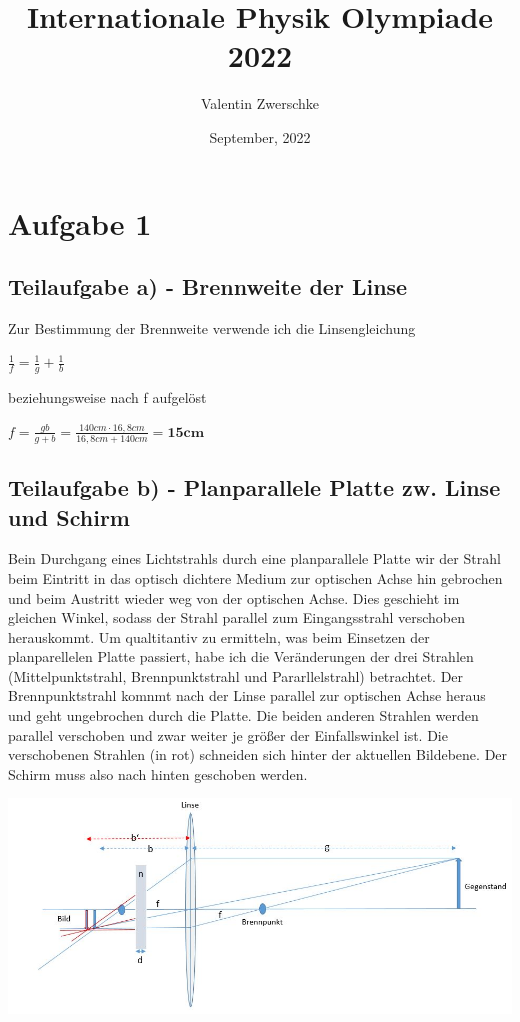 \documentclass{article}
\title{Internationale Physik Olympiade 2022}
\author{Valentin Zwerschke}
\date{September, 2022}
\begin{document}
\maketitle
\section*{Aufgabe 1}
\subsection*{Teilaufgabe a) - Brennweite der Linse}
Zur Bestimmung der Brennweite verwende ich die Linsengleichung
\begin{center}
	$\frac{1}{f}=\frac{1}{g}+\frac{1}{b}$
\end{center}
beziehungsweise nach f aufgelöst
\begin{center}
	$f=\frac{gb}{g+b}=\frac{140cm\cdot16,8cm}{16,8cm+140cm}=\textbf{15cm}$
\end{center}
\subsection*{Teilaufgabe b) - Planparallele Platte zw. Linse und Schirm}
Bein Durchgang eines Lichtstrahls durch eine planparallele Platte wir der Strahl beim Eintritt in das optisch dichtere
Medium zur optischen Achse hin gebrochen und beim Austritt wieder weg von der optischen Achse. Dies geschieht im gleichen Winkel, 
sodass der Strahl parallel zum Eingangsstrahl verschoben herauskommt.   
Um qualtitantiv zu ermitteln, was beim Einsetzen der planparellelen Platte passiert, habe ich die Veränderungen der drei Strahlen (Mittelpunktstrahl, Brennpunktstrahl und Pararllelstrahl) betrachtet.
Der Brennpunktstrahl komnmt nach der Linse parallel zur optischen Achse heraus und geht ungebrochen durch die Platte. Die beiden anderen Strahlen werden parallel verschoben und zwar weiter je größer der Einfallswinkel ist. 
Die verschobenen Strahlen (in rot) schneiden sich hinter der aktuellen Bildebene. Der Schirm muss also nach hinten geschoben werden.
\begin{center}
	\includegraphics[scale=0.45]{Linse.JPG}
\end{center}
\end{document}
